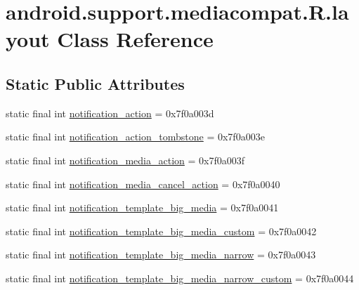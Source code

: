 \hypertarget{classandroid_1_1support_1_1mediacompat_1_1R_1_1layout}{}\section{android.\+support.\+mediacompat.\+R.\+layout Class Reference}
\label{classandroid_1_1support_1_1mediacompat_1_1R_1_1layout}
\subsection*{Static Public Attributes}
\begin{DoxyCompactItemize}
\item 
static final int \mbox{\hyperlink{classandroid_1_1support_1_1mediacompat_1_1R_1_1layout_ab25d299914399f971acb340817848876}{notification\+\_\+action}} = 0x7f0a003d
\item 
static final int \mbox{\hyperlink{classandroid_1_1support_1_1mediacompat_1_1R_1_1layout_a55962c7fb3b86ebe951cc7a2ca92c207}{notification\+\_\+action\+\_\+tombstone}} = 0x7f0a003e
\item 
static final int \mbox{\hyperlink{classandroid_1_1support_1_1mediacompat_1_1R_1_1layout_abcade0350ba1b475e850cae81ee3248c}{notification\+\_\+media\+\_\+action}} = 0x7f0a003f
\item 
static final int \mbox{\hyperlink{classandroid_1_1support_1_1mediacompat_1_1R_1_1layout_a0478c67fc8c1d467283f34208e912544}{notification\+\_\+media\+\_\+cancel\+\_\+action}} = 0x7f0a0040
\item 
static final int \mbox{\hyperlink{classandroid_1_1support_1_1mediacompat_1_1R_1_1layout_a3e35d67668e93a2231704b7d96670c8a}{notification\+\_\+template\+\_\+big\+\_\+media}} = 0x7f0a0041
\item 
static final int \mbox{\hyperlink{classandroid_1_1support_1_1mediacompat_1_1R_1_1layout_a9011bb386f5b3ed3fc16b1493a2c382d}{notification\+\_\+template\+\_\+big\+\_\+media\+\_\+custom}} = 0x7f0a0042
\item 
static final int \mbox{\hyperlink{classandroid_1_1support_1_1mediacompat_1_1R_1_1layout_af4df4ca0ed9f4fd959614bf1aacd732a}{notification\+\_\+template\+\_\+big\+\_\+media\+\_\+narrow}} = 0x7f0a0043
\item 
static final int \mbox{\hyperlink{classandroid_1_1support_1_1mediacompat_1_1R_1_1layout_aa1f59330e7339efaabd3ff44b2b4141d}{notification\+\_\+template\+\_\+big\+\_\+media\+\_\+narrow\+\_\+custom}} = 0x7f0a0044
\item 

\end{DoxyCompactItemize}

